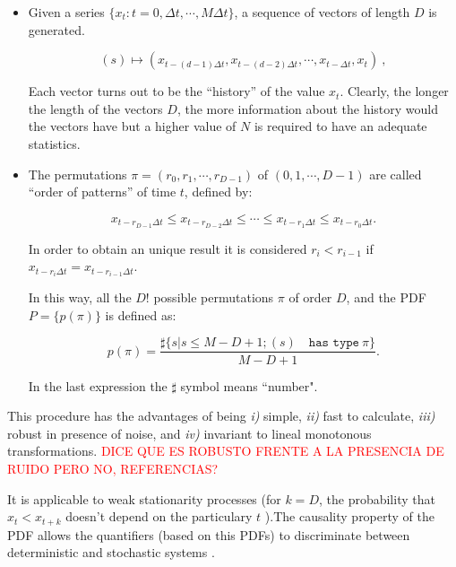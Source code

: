 \begin{itemize}
\item Given a series $\{x_t : t=0, \Delta t, \cdots,M\Delta t \}$, a sequence of vectors of length $D$ is generated.

\begin{equation}
\label{eq:vectores}
(s)\mapsto \left(x_{t-(d-1)\Delta t},x_{t-(d-2)\Delta t},\cdots,x_{t-\Delta t},x_{t}\right) \ ,
\end{equation}

Each vector turns out to be the ``history'' of the value $x_t$. Clearly, the longer the length of the vectors $D$, the more information about the history would the vectors have but a higher value of $N$ is required to have an adequate statistics. 

\item The permutations $\pi=(r_0, r_1, \cdots, r_{D-1})$ of $(0, 1, \cdots, D-1)$ are called ``order of patterns'' of time $t$, defined by:

\begin{equation}
\label{eq:permuta}
x_{t-r_{D-1}\Delta t}\le x_{t-r_{D-2}\Delta t}\le\cdots\le x_{t-r_{1}\Delta t}\le x_{t-r_0\Delta t}.
\end{equation}

In order to obtain an unique result it is considered $r_i<r_{i-1}$ if $x_{t-r_{i}\Delta t}=x_{t-r_{i-1}\Delta t}$.

In this way, all the $D!$ possible permutations $\pi$ of order $D$, and the PDF $P=\{p(\pi)\}$ is defined as:

\begin{equation}
\label{eq:frequ}
p(\pi)=\frac{\sharp \{s|s\leq M-D+1; (s) \quad \texttt{has type}~\pi\}}{M-D+1}.
\end{equation}

In the last expression the $\sharp$ symbol means ``number".
\end{itemize}

This procedure has the advantages of being {\it i)} simple, {\it ii)} fast to calculate, {\it iii)} robust in presence of noise, and {\it iv)} invariant to lineal monotonous transformations. \textcolor{red}{DICE QUE ES ROBUSTO FRENTE A LA PRESENCIA DE RUIDO PERO NO, REFERENCIAS?}

It is applicable to weak stationarity processes (for $k=D$, the probability that $x_t < x_{t+k}$ doesn't depend on the particulary $t$ \cite{Bandt2002}).The causality property of the PDF allows the quantifiers (based on this PDFs) to discriminate between deterministic and stochastic systems \cite{Rosso2007B}.

